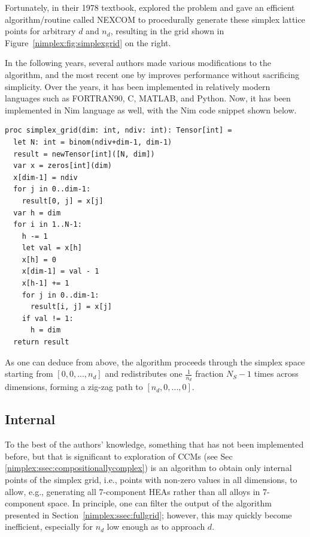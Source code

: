 Fortunately, in their 1978 textbook, \citet{Nijenhuis1978CombinatorialCalculators} explored the problem and gave an efficient algorithm/routine called NEXCOM to procedurally generate these simplex lattice points for arbitrary $d$ and $n_d$, resulting in the grid shown in Figure~\ref{nimplex:fig:simplexgrid} on the right.

In the following years, several authors made various modifications to the algorithm, and the most recent one by \citet{Chasalow1995AlgorithmPoints} improves performance without sacrificing simplicity. Over the years, it has been implemented in relatively modern languages such as FORTRAN90, C, MATLAB, and Python. Now, it has been implemented in Nim language as well, with the Nim code snippet shown below.

\begin{verbatim}
proc simplex_grid(dim: int, ndiv: int): Tensor[int] =
  let N: int = binom(ndiv+dim-1, dim-1)
  result = newTensor[int]([N, dim])
  var x = zeros[int](dim)
  x[dim-1] = ndiv
  for j in 0..dim-1:
    result[0, j] = x[j]
  var h = dim
  for i in 1..N-1:
    h -= 1
    let val = x[h]
    x[h] = 0
    x[dim-1] = val - 1
    x[h-1] += 1
    for j in 0..dim-1:
      result[i, j] = x[j]
    if val != 1:
      h = dim
  return result
\end{verbatim}

As one can deduce from above, the algorithm proceeds through the simplex space starting from $[0, 0, ..., n_d]$ and redistributes one $\frac{1}{n_d}$ fraction $N_S-1$ times across dimensions, forming a zig-zag path to $[n_d, 0, ..., 0]$.

\subsection{Internal} \label{nimplex:ssec:internalgrid}

To the best of the authors' knowledge, something that has not been implemented before, but that is significant to exploration of CCMs  (see Sec \ref{nimplex:ssec:compositionallycomplex}) is an algorithm to obtain only internal points of the simplex grid, i.e., points with non-zero values in all dimensions, to allow, e.g., generating all 7-component HEAs rather than all alloys in 7-component space. In principle, one can filter the output of the algorithm presented in Section~\ref{nimplex:ssec:fullgrid}; however, this may quickly become inefficient, especially for $n_d$ low enough as to approach $d$. 


